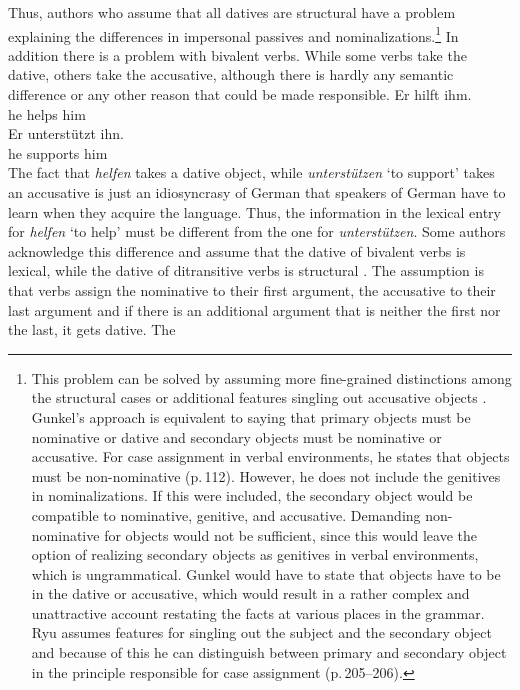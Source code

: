 Thus, authors who assume that all datives are structural have a problem explaining the differences in
impersonal passives and nominalizations.\footnote{\label{fn-structural-dative}
  This problem can be solved by assuming more fine-grained distinctions among the structural cases
  \citep[]{Gunkel2003b} or additional features singling out accusative objects
  \citep[]{Ryu97a}. Gunkel's approach is equivalent to saying that primary objects must be nominative
  or dative and secondary objects must be nominative or accusative. For case assignment in verbal
  environments, he states that objects must be non-nominative (p.\,112). However, he does not include the
  genitives in nominalizations. If this were included, the secondary object would be compatible to
  nominative, genitive, and accusative. Demanding non-nominative for objects would not be
  sufficient, since this would leave the option of realizing secondary objects as genitives in
  verbal environments, which is ungrammatical. Gunkel would have to state that objects have to
  be in the dative or accusative, which would result in a rather complex and unattractive
  account restating the facts at various places in the grammar. Ryu assumes features for singling
  out the subject and the secondary object and because of this he can distinguish between primary
  and secondary object in the principle responsible for case assignment (p.\,205--206). 
} In addition there is a problem with bivalent verbs. While
some verbs take the dative, others take the accusative, although there is hardly any semantic
difference or any other reason that could be made responsible.
\eal
\ex 
\gll Er hilft ihm.\\
     he helps him\\
\ex 
\gll Er unterstützt ihn.\\
     he supports him\\
\zl
The fact that \emph{helfen} takes a dative object, while \emph{unterstützen} `to support' takes an accusative is
just an idiosyncrasy of German that speakers of German have to learn when they acquire the
language. Thus, the information in the lexical entry for \emph{helfen} `to help' must be different from the one
for \emph{unterstützen}. Some authors acknowledge this difference and assume that the dative of
bivalent verbs is lexical, while the dative of ditransitive verbs is structural \citep[, 51]{Wunderlich97a}. The assumption is
that verbs assign the nominative to their first argument, the accusative to their last argument and
if there is an additional argument that is neither the first nor the last, it gets dative. The
